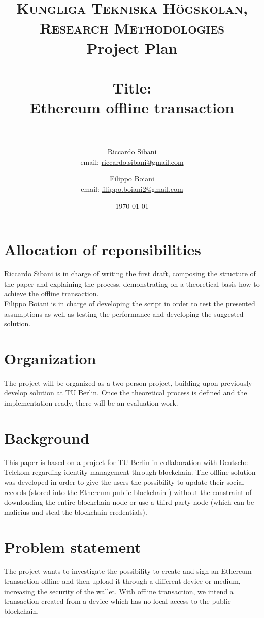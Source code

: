 \documentclass[paper=a4, fontsize=11pt]{scrartcl} %
\title{
\normalfont \normalsize
\textsc{Kungliga Tekniska Högskolan, Research Methodologies} \\ [10pt] %
Project Plan \\ [25pt]
\horrule{0.5pt} \\[0.4cm] %
\huge Title:\\Ethereum offline transaction \\ %
\vspace{5mm}
\horrule{2pt} \\[0.5cm] %
}
\author{Riccardo Sibani \\ email: \href{mailto:riccardo.sibani@gmail.com}{riccardo.sibani@gmail.com}
   \and Filippo Boiani \\ email: \href{mailto:filippo.boiani2@gmail.com}{filippo.boiani2@gmail.com} } %
\date{\normalsize\today} %
\numberwithin{equation}{section} %
\numberwithin{figure}{section} %
\numberwithin{table}{section} %
\begin{document}
\maketitle %


\section{Allocation of reponsibilities}
Riccardo Sibani is in charge of writing the first draft, composing the structure of the paper and explaining the process, demonstrating on a theoretical basis how to achieve the offline transaction. \\
Filippo Boiani is in charge of developing the script in order to test the presented assumptions as well as testing the performance and developing the suggested solution.

\section{Organization}
The project will be organized as a two-person project, building upon previously develop solution at TU Berlin. Once the theoretical process is defined and the implementation ready, there will be an evaluation work.

\section{Background}

This paper is based on a project for TU Berlin in collaboration with Deutsche Telekom regarding identity management through blockchain. The offline solution was developed in order to give the users the possibility to update their social records (stored into the Ethereum public blockchain \cite{wood2014ethereum}) without the constraint of downloading the entire blockchain node or use a third party node (which can be malicius and steal the blockchain credentials).

\section{Problem statement}

The project wants to investigate the possibility to create and sign an Ethereum transaction offline and then upload it through a different device or medium, increasing the security of the wallet. With offline transaction, we intend a transaction created from a device which has no local access to the public blockchain.
\end{document}
